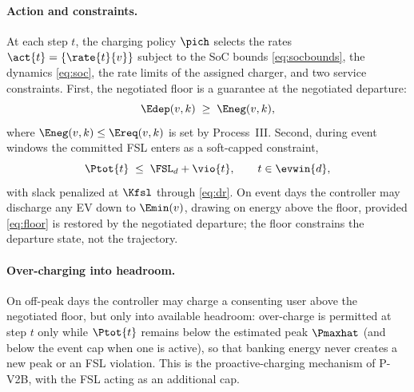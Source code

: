 \paragraph{Action and constraints.} At each step $t$, the charging
policy $\pich$ selects the rates $\act{t} = \{\rate{t}{v}\}$ subject to
the SoC bounds \eqref{eq:socbounds}, the dynamics \eqref{eq:soc}, the
rate limits of the assigned charger, and two service constraints. First,
the negotiated floor is a guarantee at the negotiated departure:
\begin{equation}\label{eq:floor}
\Edep(v,k) \;\ge\; \Eneg(v,k),
\end{equation}
where $\Eneg(v,k) \le \Ereq(v,k)$ is set by Process~III. Second, during
event windows the committed FSL enters as a soft-capped constraint,
\begin{equation}\label{eq:fslslack}
\Ptot{t} \;\le\; \FSL_d + \vio{t}, \qquad t \in \evwin{d},
\end{equation}
with slack penalized at $\Kfsl$ through \eqref{eq:dr}. On event days the
controller may discharge any EV down to $\Emin(v)$, drawing on energy
above the floor, provided \eqref{eq:floor} is restored by the negotiated
departure; the floor constrains the departure state, not the
trajectory.

\paragraph{Over-charging into headroom.} On off-peak days the controller
may charge a consenting user above the negotiated floor, but only into
available headroom: over-charge is permitted at step $t$ only while
$\Ptot{t}$ remains below the estimated peak $\Pmaxhat$ (and below the
event cap when one is active), so that banking energy never creates a
new peak or an FSL violation. This is the proactive-charging mechanism
of P-V2B, with the FSL acting as an additional cap.

